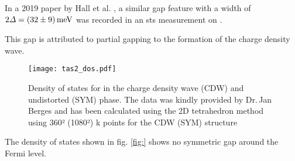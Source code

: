 \documentclass[main.tex]{subfiles}
\begin{document}
In a 2019 paper by Hall et al. \cite{hall_environmental_2019}, a similar gap feature with a width of \(2 \Delta = \SI[separate-uncertainty = true]{32 \pm 9}{\milli\eV}\) was recorded in an \acrshort{sts} measurement on \TaS.

This gap is attributed to partial gapping to the formation of the charge density wave.

\begin{figure}[htb!]
    \centering
    \texttt{[image: tas2\_dos.pdf]}
    \caption{Density of states for \TaS in the charge density wave (CDW) and undistorted (SYM) phase. The data was kindly provided by Dr.\,Jan Berges and has been calculated using the 2D tetrahedron method using 360² (1080²) k points for the CDW (SYM) structure}
    \label{fig:tas2_dos}
\end{figure}
The density of states shown in fig. \ref{fig:} shows no symmetric gap around the Fermi level.
\end{document}

